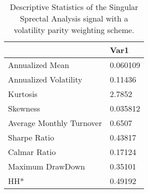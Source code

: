 \begin{table}[H]
\centering
\begin{tabular}{ll}
& Var1 \\ 
\hline 
Annualized Mean & 0.060109 \\ 
Annualized Volatility & 0.11436 \\ 
Kurtosis & 2.7852 \\ 
Skewness & 0.035812 \\ 
Average Monthly Turnover & 0.6507 \\ 
Sharpe Ratio & 0.43817 \\ 
Calmar Ratio & 0.17124 \\ 
Maximum DrawDown & 0.35101 \\ 
HH* & 0.49192 \\ 
\hline
\end{tabular}
\caption{Descriptive Statistics of the Singular Sprectal Analysis signal with a volatility parity weighting scheme.}
\label{SSA}
\end{table}